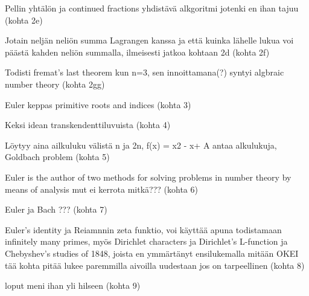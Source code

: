 \documentclass[a4paper,11pt]{article}
\begin{document}
Pellin yhtälön ja continued fractions yhdistävä alkgoritmi jotenki en ihan tajuu (kohta 2e)

Jotain neljän neliön summa Lagrangen kanssa ja että kuinka lähelle lukua voi päästä kahden neliön summalla, ilmeisesti jatkoa kohtaan 2d (kohta 2f)

Todisti fremat's last theorem kun n=3, sen innoittamana(?) syntyi algbraic number theory (kohta 2gg)

Euler keppas  primitive roots and indices (kohta 3)

Keksi idean transkendenttiluvuista (kohta 4)

Löytyy aina ailkuluku välistä n ja 2n, f(x) = x2 - x+ A antaa alkulukuja, Goldbach problem (kohta 5)

Euler is the author of two methods for solving problems in number theory by means of analysis mut ei kerrota mitkä??? (kohta 6)

Euler ja Bach ??? (kohta 7)

Euler's identity ja Reiamnnin zeta funktio, voi käyttää apuna todistamaan infinitely many primes, myös Dirichlet characters ja Dirichlet’s
L-function ja Chebyshev’s studies of 1848, joista en ymmärtänyt ensilukemalla mitään OKEI tää kohta pitää lukee paremmilla aivoilla uudestaan jos on tarpeellinen (kohta 8)

loput meni ihan yli hilseen (kohta 9)

 
\nocite{*}
\printbibliography
 

 
\end{document}
